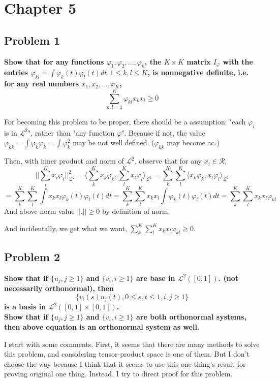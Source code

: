 \documentclass{article}
\begin{document}
\section{Chapter 5}
\subsection{Problem 1}
\textbf{
Show that for any functions $\varphi_1,\varphi_2,...,\varphi_k$, the $K\times K$ matrix $I_\varphi$
with the entries $\varphi_{kl}=\int{\varphi_k(t)\varphi_l(t)dt}, 1\leq k,l\leq K$, is nonnegative definite, 
i.e. for any real numbers $x_1,x_2,...,x_K$,
\[\sum_{k,l=1}^K \varphi_{kl}x_kx_l\geq 0\]
}

For becoming this problem to be proper, there should be a assumption: "each $\varphi_i$ is in $\mathcal{L}^2$",
rather than "any function $\varphi$".
Because if not, the value $\varphi_{kk}=\int\varphi_k\varphi_k=\int\varphi_k^2$ may be not well defined. 
($\varphi_{kk}$ may become $\infty$.)

Then, with inner product and norm of $\mathcal{L}^2$, observe that for any $x_i\in\mathcal{R}$,
\[||\sum_i^K{x_i\varphi_i}||_{\mathcal{L}^2}^2 = \langle \sum_k^K{x_k\varphi_k}, \sum_l^K{x_l\varphi_l} \rangle_{\mathcal{L}^2}
= \sum_k^K \sum_l^K \langle x_k\varphi_k, x_l\varphi_l \rangle_{\mathcal{L}^2}\]
\[=\sum_k^K \sum_l^K \int{x_k x_l \varphi_k(t) \varphi_l(t) dt} 
=\sum_k^K \sum_l^K x_k x_l \int{\varphi_k(t) \varphi_l(t) dt} 
=\sum_k^K \sum_l^K x_k x_l \varphi_{kl}\]
And above norm value $||.||\geq 0 $ by definition of norm.

And incidentally, we get what we want, \(\sum_k^K \sum_l^K x_k x_l \varphi_{kl} \geq 0\).


\subsection{Problem 2}
\textbf{
Show that if $\{u_j, j\geq 1\}$ and $\{v_i, i\geq 1\}$ are base in $\mathcal{L}^2([0,1])$.
(not necessarily orthonormal), then
\[\{v_i(s)u_j(t), 0\leq s,t \leq 1 , i,j\geq 1\}\]
is a basis in $\mathcal{L}^2([0,1]\times[0,1])$. \\
Show that if $\{u_j, j\geq 1\}$ and $\{v_i, i\geq 1\}$ are both orthonormal systems,
then above equation is an orthonormal system as well.
}

I start with some comments. First, it seems that there are many methods to solve this problem, and considering tensor-product space is one of them.
But I don't choose the way because I think that it seems to use this one thing's result for proving original one thing.
Instead, I try to direct proof for this problem.
\end{document}
